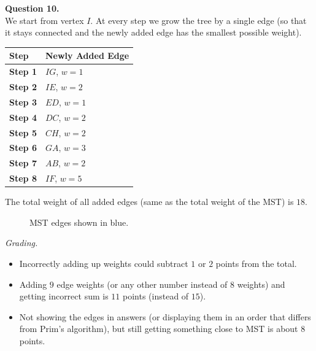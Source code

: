 \documentclass[jou]{apa6}
\begin{document}
\newpage
{\bf Question 10.}\\

We start from vertex $I$. At every step we 
grow the tree by a single edge (so that it stays connected
and the newly added edge has the smallest possible weight). 


\begin{tabular}{|l|l|} \hline
{\bf Step} & {\bf Newly Added Edge} \\ \hline
{\bf Step 1} & $IG$, $w=1$ \\ \hline
{\bf Step 2} & $IE$, $w=2$ \\ \hline
{\bf Step 3} & $ED$, $w=1$ \\ \hline
{\bf Step 4} & $DC$, $w=2$ \\ \hline
{\bf Step 5} & $CH$, $w=2$ \\ \hline
{\bf Step 6} & $GA$, $w=3$ \\ \hline
{\bf Step 7} & $AB$, $w=2$ \\ \hline
{\bf Step 8} & $IF$, $w=5$ \\ \hline
\end{tabular}


The total weight of all added edges (same as the total weight of the MST) is $18$. 


\begin{figure}[!htb]
\caption{\label{fig:prim-weighted-mst} MST edges shown in blue.}
\end{figure}

{\scriptsize
{\em Grading.} 
\begin{itemize}
\item Incorrectly adding up weights could subtract $1$ or $2$ points from the total.
\item Adding $9$ edge weights (or any other number instead of $8$ weights) and getting incorrect sum is $11$ points (instead of $15$). 
\item Not showing the edges in answers (or displaying them in an order that differs from Prim's algorithm), 
but still getting something close to MST is about $8$ points.
\end{itemize}
}
\end{document}
